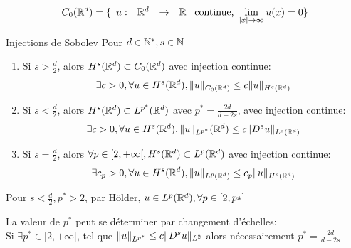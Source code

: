 \documentclass[]{report}
\begin{document}
    \begin{ra}{}{}
        \[C_0(\mathbb{R}^d)=\{\begin{array}{ccccc} u : & \mathbb{R}^d & \to & \mathbb{R} \end{array}\text{ continue, }\lim_{|x|\to\infty}u(x)=0\}\]
    \end{ra}

    \begin{tm}{Injections de Sobolev}{}
        Pour $d\in \mathbb{N}^*,s\in \mathbb{N}$
        \begin{enumerate}
            \item Si $s>\frac{d}{2}$, alors $H^s(\mathbb{R}^d)\subset C_0(\mathbb{R}^d)$ avec injection continue:
            \[\exists c>0,\forall u\in H^s(\mathbb{R}^d),\lVert u \rVert_{C_0(\mathbb{R}^d)}\le c\lVert u \rVert_{H^s(\mathbb{R}^d)}\]
            \item Si $s<\frac{d}{2}$, alors $H^s(\mathbb{R}^d)\subset L^{p^*}(\mathbb{R}^d)$ avec $p^*=\frac{2d}{d-2s}$, avec injection continue:
            \[\exists c>0,\forall u\in  H^s(\mathbb{R}^d),\lVert u \rVert_{L^{p^*}}(\mathbb{R}^d)\le c\lVert D^s u \rVert_{L^s(\mathbb{R}^d)}\]
            \item Si $s=\frac{d}{2}$, alors $\forall p\in [2,+\infty[,H^s(\mathbb{R}^d)\subset L^p(\mathbb{R}^d)$ avec injection continue:
            \[\exists c_p>0,\forall u\in H^s(\mathbb{R}^d),\lVert u \rVert_{L^p(\mathbb{R}^d)}\le c_p\lVert u \rVert_{H^s(\mathbb{R}^d)}\]
        \end{enumerate}
    \end{tm}

    \begin{re}{}{}
        Pour $s<\frac{d}{2},p^*>2$, par Hölder, $u\in L^p(\mathbb{R}^d),\forall p\in [2,p*]$
    \end{re}

    \begin{re}{}{}
        La valeur de $p^*$ peut se déterminer par changement d'échelles:\\
        Si $\exists p^*\in [2,+\infty[$, tel que $\lVert u \rVert_{L^{p^*}}\le c\lVert D^s u \rVert_{L^2}$ alors nécessairement $p^*=\frac{2d}{d-2s}$
    \end{re}
\end{document}
